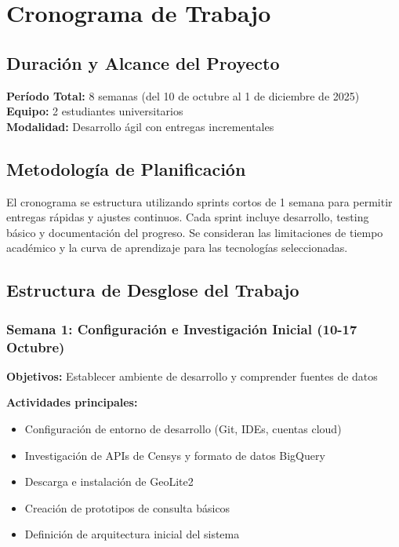 \section{Cronograma de Trabajo}

\subsection{Duración y Alcance del Proyecto}

\textbf{Período Total:} 8 semanas (del 10 de octubre al 1 de diciembre de 2025)\\
\textbf{Equipo:} 2 estudiantes universitarios\\
\textbf{Modalidad:} Desarrollo ágil con entregas incrementales

\subsection{Metodología de Planificación}

El cronograma se estructura utilizando sprints cortos de 1 semana para permitir entregas rápidas y ajustes continuos. Cada sprint incluye desarrollo, testing básico y documentación del progreso. Se consideran las limitaciones de tiempo académico y la curva de aprendizaje para las tecnologías seleccionadas.

\subsection{Estructura de Desglose del Trabajo}

\subsubsection{Semana 1: Configuración e Investigación Inicial (10-17 Octubre)}
\textbf{Objetivos:} Establecer ambiente de desarrollo y comprender fuentes de datos

\textbf{Actividades principales:}
\begin{itemize}
    \item Configuración de entorno de desarrollo (Git, IDEs, cuentas cloud)
    \item Investigación de APIs de Censys y formato de datos BigQuery
    \item Descarga e instalación de GeoLite2
    \item Creación de prototipos de consulta básicos
    \item Definición de arquitectura inicial del sistema
\end{itemize}


